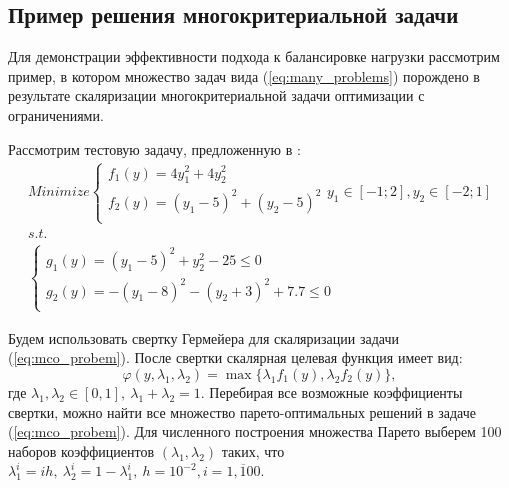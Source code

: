 \documentclass{cmi}
\begin{document}

\subsection{Пример решения многокритериальной задачи}

Для демонстрации эффективности подхода к балансировке нагрузки рассмотрим пример,
в котором множество задач вида (\ref{eq:many_problems}) порождено в результате скаляризации
многокритериальной задачи оптимизации с ограничениями.

Рассмотрим тестовую задачу, предложенную в \cite{BinhKorn1999}:
\begin{equation}
  \label{eq:mco_probem}
  \begin{array}{l}
      Minimize \left \{
      \begin{array}{l}
        f_1(y) = 4 y_1^2 + 4 y_2^2 \\
        f_2(y) = (y_1-5)^2 + (y_2-5)^2 \\
      \end{array}
      \right .
      y_1\in [-1;2],y_2\in [-2;1]
      \\s.t.
      \\
      \left \{
      \begin{array}{l}
        g_1(y) = (y_1 - 5)^2 + y_2^2 - 25 \leqslant 0 \\
        g_2(y) = -(y_1 - 8)^2 - (y_2 + 3)^2 + 7.7 \leqslant 0\\
      \end{array}
      \right .
  \end{array}
\end{equation}

Будем использовать свертку Гермейера для скаляризации задачи (\ref{eq:mco_probem}).
После свертки скалярная целевая функция имеет вид:
\begin{equation}
  \varphi(y,\lambda_1,\lambda_2)=\max\{\lambda_1 f_1(y), \lambda_2 f_2(y)\},
\end{equation}
где \(\lambda_1,\lambda_2\in[0,1],\: \lambda_1+\lambda_2=1\). Перебирая все возможные
коэффициенты свертки, можно найти все множество парето-оптимальных решений в
задаче (\ref{eq:mco_probem}). Для численного построения множества Парето выберем
100 наборов коэффициентов \((\lambda_1,\lambda_2)\) таких, что
\(\lambda_1^i=i h,\: \lambda_2^i=1-\lambda_1^i,\: h=10^{-2},i=\overline{1, 100}\).
\end{document}
